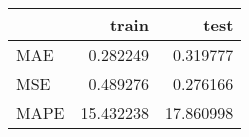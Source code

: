 \begin{tabular}{lrr}
\toprule
{} &      train &       test \\
\midrule
MAE  &   0.282249 &   0.319777 \\
MSE  &   0.489276 &   0.276166 \\
MAPE &  15.432238 &  17.860998 \\
\bottomrule
\end{tabular}
